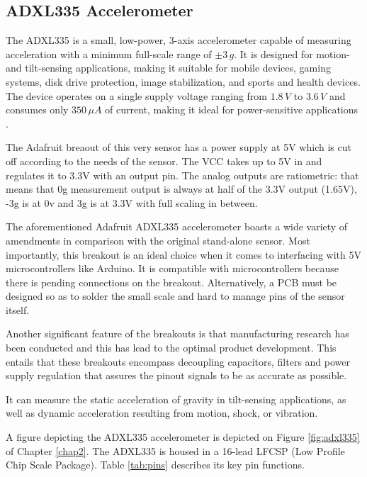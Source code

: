 \subsection{ADXL335 Accelerometer}  
{
	
	The ADXL335 is a small, low-power, 3-axis accelerometer capable of measuring acceleration with a minimum full-scale range of $\pm3\,g$. It is designed for motion- and tilt-sensing applications, making it suitable for mobile devices, gaming systems, disk drive protection, image stabilization, and sports and health devices. The device operates on a single supply voltage ranging from $1.8\,V$ to $3.6\,V$ and consumes only $350\,\mu A$ of current, making it ideal for power-sensitive applications \cite{ADXL335}. 
	
	The Adafruit breaout of this very sensor has a power supply at 5V which is cut off according to the needs of the sensor. The VCC takes up to 5V in and regulates it to 3.3V with an output pin. The analog outputs are ratiometric: that means that 0g measurement output is always at half of the 3.3V output (1.65V), -3g is at 0v and 3g is at 3.3V with full scaling in between.
	
	The aforementioned Adafruit ADXL335 accelerometer boasts a wide variety of amendments in comparison with the original stand-alone sensor. Most importantly, this breakout is an ideal choice when it comes to interfacing with 5V microcontrollers like Arduino. It is compatible with microcontrollers because there is pending connections on the breakout. Alternatively, a PCB must be designed so as to solder the small scale and hard to manage pins of the sensor itself. 
	
	Another significant feature of the breakouts is that manufacturing research has been conducted and this has lead to the optimal product development. This entails that these breakouts encompass decoupling capacitors, filters and power supply regulation that assures the pinout signals to be as accurate as possible.
	
	It can measure the static acceleration of gravity in tilt-sensing applications, as well as dynamic acceleration resulting from motion, shock, or vibration.
	
	A figure depicting the ADXL335 accelerometer is depicted on Figure \ref{fig:adxl335} of Chapter \ref{chap2}. The ADXL335 is housed in a 16-lead LFCSP (Low Profile Chip Scale Package). Table \ref{tab:pins} describes its key pin functions.
	
}
